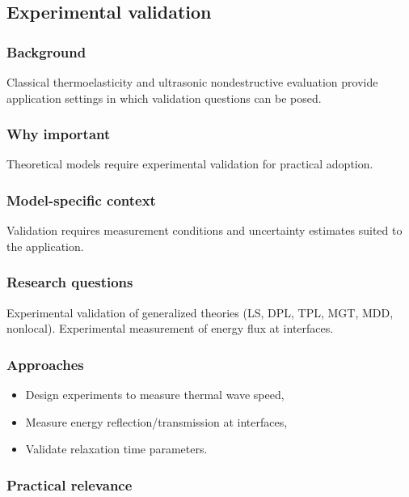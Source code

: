 \subsection{Experimental validation}
\label{sec:15.4}

\subsubsection{Background}

Classical thermoelasticity and ultrasonic nondestructive evaluation provide application settings in which validation questions can be posed.

\subsubsection{Why important}

Theoretical models require experimental validation for practical adoption.

\subsubsection{Model-specific context}

Validation requires measurement conditions and uncertainty estimates suited to the application.

\subsubsection{Research questions}

Experimental validation of generalized theories (LS, DPL, TPL, MGT, MDD, nonlocal). Experimental measurement of energy flux at interfaces.

\subsubsection{Approaches}

\begin{itemize}
\item Design experiments to measure thermal wave speed,
\item Measure energy reflection/transmission at interfaces,
\item Validate relaxation time parameters.
\end{itemize}

\subsubsection{Practical relevance}

